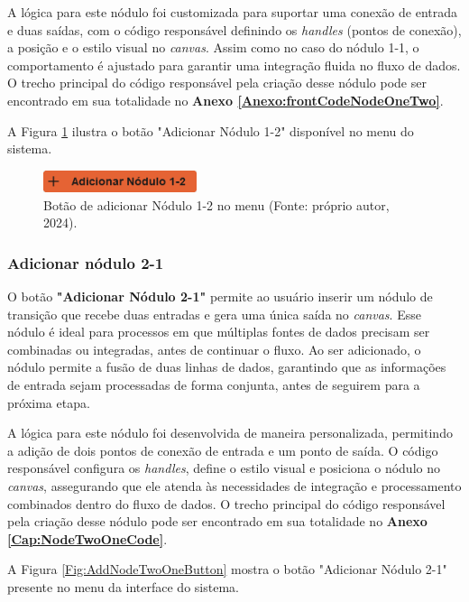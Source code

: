 A lógica para este nódulo foi customizada para suportar uma conexão de entrada e duas saídas, com o código responsável definindo os \textit{handles} (pontos de conexão), a posição e o estilo visual no \textit{canvas}. Assim como no caso do nódulo 1-1, o comportamento é ajustado para garantir uma integração fluida no fluxo de dados. O trecho principal do código responsável pela criação desse nódulo pode ser encontrado em sua totalidade no \textbf{Anexo \ref{Anexo:frontCodeNodeOneTwo}}.

A Figura \ref{Fig:AddNodeOneTwoButton} ilustra o botão "Adicionar Nódulo 1-2" disponível no menu do sistema.

\begin{figure}[htbp]
    \centering
    \includegraphics[width=0.4\textwidth]{figuras/add-node12-button.png}
    \caption{Botão de adicionar Nódulo 1-2 no menu (Fonte: próprio autor, 2024).}
    \label{Fig:AddNodeOneTwoButton}
\end{figure}

\subsubsection{Adicionar nódulo 2-1}

O botão \textbf{"Adicionar Nódulo 2-1"} permite ao usuário inserir um nódulo de transição que recebe duas entradas e gera uma única saída no \textit{canvas}. Esse nódulo é ideal para processos em que múltiplas fontes de dados precisam ser combinadas ou integradas, antes de continuar o fluxo. Ao ser adicionado, o nódulo permite a fusão de duas linhas de dados, garantindo que as informações de entrada sejam processadas de forma conjunta, antes de seguirem para a próxima etapa.

A lógica para este nódulo foi desenvolvida de maneira personalizada, permitindo a adição de dois pontos de conexão de entrada e um ponto de saída. O código responsável configura os \textit{handles}, define o estilo visual e posiciona o nódulo no \textit{canvas}, assegurando que ele atenda às necessidades de integração e processamento combinados dentro do fluxo de dados. O trecho principal do código responsável pela criação desse nódulo pode ser encontrado em sua totalidade no \textbf{Anexo \ref{Cap:NodeTwoOneCode}}.

A Figura \ref{Fig:AddNodeTwoOneButton} mostra o botão "Adicionar Nódulo 2-1" presente no menu da interface do sistema.

